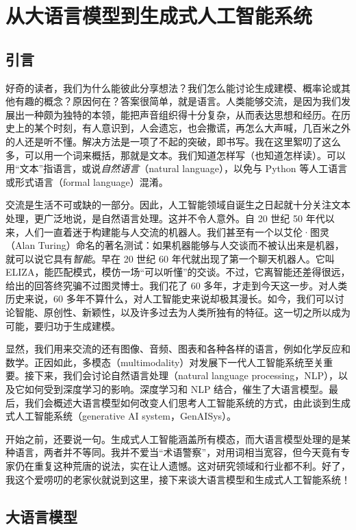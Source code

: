 \chapter{从大语言模型到生成式人工智能系统}
\label{ch:genaisys}

\section{引言}
好奇的读者，我们为什么能彼此分享想法？我们怎么能讨论生成建模、概率论或其他有趣的概念？原因何在？答案很简单，就是语言。人类能够交流，是因为我们发展出一种颇为独特的本领，能把声音组织得十分复杂，从而表达思想和经历。在历史上的某个时刻，有人意识到，人会遗忘，也会撒谎，再怎么大声喊，几百米之外的人还是听不懂。解决方法是一项了不起的突破，即书写。我在这里絮叨了这么多，可以用一个词来概括，那就是文本。我们知道怎样写（也知道怎样读）。可以用“文本”指语言，或说\emph{自然语言}（natural language），以免与 Python 等人工语言或形式语言（formal language）混淆。

交流是生活不可或缺的一部分。因此，人工智能领域自诞生之日起就十分关注文本处理，更广泛地说，是自然语言处理。这并不令人意外。自 20 世纪 50 年代以来，人们一直着迷于构建能与人交流的机器人。我们甚至有一个以艾伦·图灵（Alan Turing）命名的著名测试：如果机器能够与人交谈而不被认出来是机器，就可以说它具有\emph{智能}。早在 20 世纪 60 年代就出现了第一个聊天机器人。它叫 ELIZA，能匹配模式，模仿一场“可以听懂”的交谈。不过，它离智能还差得很远，给出的回答终究骗不过图灵博士。我们花了 60 多年，才走到今天这一步。对人类历史来说，60 多年不算什么，对人工智能史来说却极其漫长。如今，我们可以讨论智能、原创性、新颖性，以及许多过去为人类所独有的特征。这一切之所以成为可能，要归功于生成建模。

显然，我们用来交流的还有图像、音频、图表和各种各样的语言，例如化学反应和数学。正因如此，多模态（multimodality）对发展下一代人工智能系统至关重要。接下来，我们会讨论自然语言处理（natural language processing，NLP），以及它如何受到深度学习的影响。深度学习和 NLP 结合，催生了大语言模型。最后，我们会概述大语言模型如何改变人们思考人工智能系统的方式，由此谈到生成式人工智能系统（generative AI system，GenAISys）。

开始之前，还要说一句。生成式人工智能涵盖所有模态，而大语言模型处理的是某种语言，两者并不等同。我并不爱当“术语警察”，对用词相当宽容，但今天竟有专家仍在重复这种荒唐的说法，实在让人遗憾。这对研究领域和行业都不利。好了，我这个爱唠叨的老家伙就说到这里，接下来谈大语言模型和生成式人工智能系统！

\section{大语言模型}
